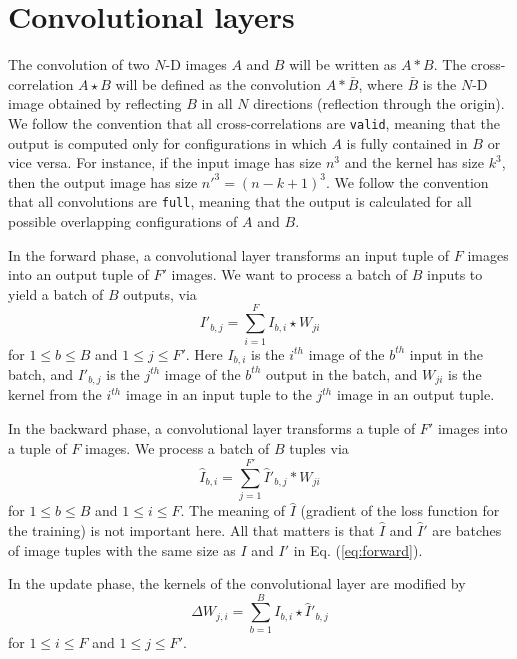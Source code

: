 \section{Convolutional layers} \label{sec-conv-layers}
  The convolution of two $N$-D images $A$ and $B$ will be written as
  $A*B$.  The cross-correlation $A\star B$ will be defined as the
  convolution $A\ast\bar{B}$, where $\bar{B}$ is the $N$-D
  image obtained by reflecting $B$ in all $N$ directions (reflection
  through the origin). We follow the convention that all
  cross-correlations are \texttt{valid}, meaning that the output is
  computed only for configurations in which $A$ is fully contained in
  $B$ or vice versa.  For instance, if the input image has size $n^3$
  and the kernel has size $k^3$, then the output image has size $n'^3
  = (n-k+1)^3$.  We follow the convention that all convolutions are
  \texttt{full}, meaning that the output is calculated for all
  possible overlapping configurations of $A$ and $B$.

  In the forward phase, a convolutional layer
  transforms an input tuple of $F$ images into an output tuple of $F'$
  images.  We want to process a batch of $B$ inputs to yield a batch
  of $B$ outputs, via
  \begin{equation}\label{eq:forward}
  I'_{b,j} = \sum_{i=1}^F I_{b,i}\star W_{ji}
  \end{equation}
  for $1 \le b \le B$ and $1 \le j \le F'$.  Here $I_{b,i}$ is the
  $i^{th}$ image of the $b^{th}$ input in the batch, and $I'_{b,j}$ is
  the $j^{th}$ image of the $b^{th}$ output in the batch, and $W_{ji}$
  is the kernel from the $i^{th}$ image in an input tuple to the
  $j^{th}$ image in an output tuple.

  In the backward phase, a convolutional layer transforms a tuple of
  $F'$ images into a tuple of $F$ images.  We process a batch of $B$
  tuples via
  \begin{equation}\label{eq:backward}
  \hat{I}_{b,i} = \sum_{j=1}^{F'} \hat{I}'_{b,j} \ast W_{ji}
  \end{equation}
  for $1 \le b \le B$ and $1 \le i \le F$.  The meaning of
  $\hat{I}$ (gradient of the loss function for the training) is not
  important here.  All that matters is that $\hat{I}$ and $\hat{I}'$
  are batches of image tuples with the same size as $I$ and $I'$ in
  Eq. (\ref{eq:forward}).

  In the update phase, the kernels of the convolutional layer are
  modified by
  \[
  \Delta W_{j,i} = \sum_{b=1}^B I_{b,i} \star \hat{I}'_{b,j}
  \]
  for $1 \le i \le F$ and $1 \le j \le F'$.

